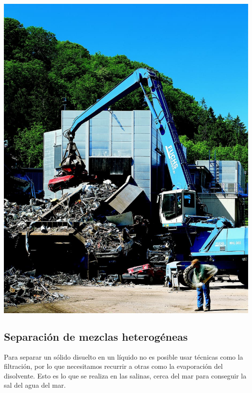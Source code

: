 \begin{center}
\includegraphics[scale=0.4]{imagenes/iman} 
\end{center}



\subsection{Separación de mezclas heterogéneas}

Para separar un sólido disuelto en un líquido no es posible usar técnicas como la filtración, por lo que necesitamos recurrir a otras como la evaporación del disolvente. Esto es lo que se realiza en las salinas, cerca del mar para conseguir la sal del agua del mar. 

